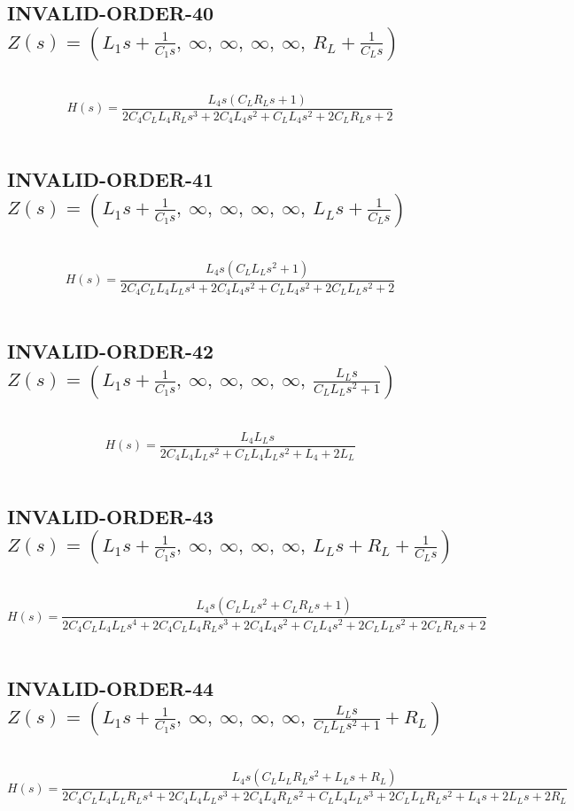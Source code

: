 \documentclass{article}
\begin{document}
\subsection{INVALID-ORDER-40 $Z(s) = \left( L_{1} s + \frac{1}{C_{1} s}, \  \infty, \  \infty, \  \infty, \  \infty, \  R_{L} + \frac{1}{C_{L} s}\right)$ } \ 
\textbf{\[H(s) = \frac{L_{4} s \left(C_{L} R_{L} s + 1\right)}{2 C_{4} C_{L} L_{4} R_{L} s^{3} + 2 C_{4} L_{4} s^{2} + C_{L} L_{4} s^{2} + 2 C_{L} R_{L} s + 2}\] } \ 
\subsection{INVALID-ORDER-41 $Z(s) = \left( L_{1} s + \frac{1}{C_{1} s}, \  \infty, \  \infty, \  \infty, \  \infty, \  L_{L} s + \frac{1}{C_{L} s}\right)$ } \ 
\textbf{\[H(s) = \frac{L_{4} s \left(C_{L} L_{L} s^{2} + 1\right)}{2 C_{4} C_{L} L_{4} L_{L} s^{4} + 2 C_{4} L_{4} s^{2} + C_{L} L_{4} s^{2} + 2 C_{L} L_{L} s^{2} + 2}\] } \ 
\subsection{INVALID-ORDER-42 $Z(s) = \left( L_{1} s + \frac{1}{C_{1} s}, \  \infty, \  \infty, \  \infty, \  \infty, \  \frac{L_{L} s}{C_{L} L_{L} s^{2} + 1}\right)$ } \ 
\textbf{\[H(s) = \frac{L_{4} L_{L} s}{2 C_{4} L_{4} L_{L} s^{2} + C_{L} L_{4} L_{L} s^{2} + L_{4} + 2 L_{L}}\] } \ 
\subsection{INVALID-ORDER-43 $Z(s) = \left( L_{1} s + \frac{1}{C_{1} s}, \  \infty, \  \infty, \  \infty, \  \infty, \  L_{L} s + R_{L} + \frac{1}{C_{L} s}\right)$ } \ 
\textbf{\[H(s) = \frac{L_{4} s \left(C_{L} L_{L} s^{2} + C_{L} R_{L} s + 1\right)}{2 C_{4} C_{L} L_{4} L_{L} s^{4} + 2 C_{4} C_{L} L_{4} R_{L} s^{3} + 2 C_{4} L_{4} s^{2} + C_{L} L_{4} s^{2} + 2 C_{L} L_{L} s^{2} + 2 C_{L} R_{L} s + 2}\] } \ 
\subsection{INVALID-ORDER-44 $Z(s) = \left( L_{1} s + \frac{1}{C_{1} s}, \  \infty, \  \infty, \  \infty, \  \infty, \  \frac{L_{L} s}{C_{L} L_{L} s^{2} + 1} + R_{L}\right)$ } \ 
\textbf{\[H(s) = \frac{L_{4} s \left(C_{L} L_{L} R_{L} s^{2} + L_{L} s + R_{L}\right)}{2 C_{4} C_{L} L_{4} L_{L} R_{L} s^{4} + 2 C_{4} L_{4} L_{L} s^{3} + 2 C_{4} L_{4} R_{L} s^{2} + C_{L} L_{4} L_{L} s^{3} + 2 C_{L} L_{L} R_{L} s^{2} + L_{4} s + 2 L_{L} s + 2 R_{L}}\] } \ 
\end{document}
